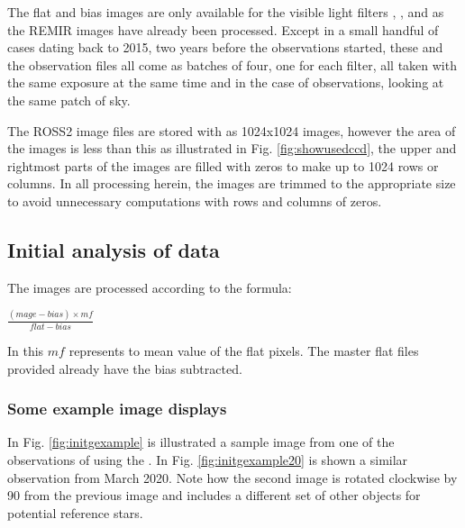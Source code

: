 The flat and bias images are only available for the visible light filters
, ,  and  as the REMIR images
have already been processed. Except in a small handful of cases dating back to 2015, two years
before the {\rdwarf} observations started, these and the observation files all
come as batches of four, one for each filter, all taken with the same exposure at the same time
and in the case of observations, looking at the same patch of sky.

The ROSS2 image files are stored with as 1024x1024 images, however the area of
the images is less than this as illustrated in Fig. \ref{fig:showusedccd}, the
upper and rightmost parts of the images are filled with zeros to make up to 1024
rows or columns. In all processing herein, the images are trimmed to the
appropriate size to avoid unnecessary computations with rows and columns of
zeros.

\subsection{Initial analysis of data}
\protect\label{section:initialanalysis}

The images are processed according to the formula:

\begin{center}
$ \frac{(mage - bias) \times mf}{flat - bias}$
\end{center}

In this $mf$ represents to mean value of the flat pixels. The master flat files
provided already have the bias subtracted.

\subsubsection{Some example image displays}
\protect\label{section:eximages}

In Fig. \ref{fig:initgexample} is illustrated a sample image from one of the
observations of {\bstar} using the {\gfilter}. In Fig.
\ref{fig:initgexample20} is shown a similar observation from March 2020. Note
how the second image is rotated clockwise by 90\degree{} from the previous image
and includes a different set of other objects for potential reference stars.

